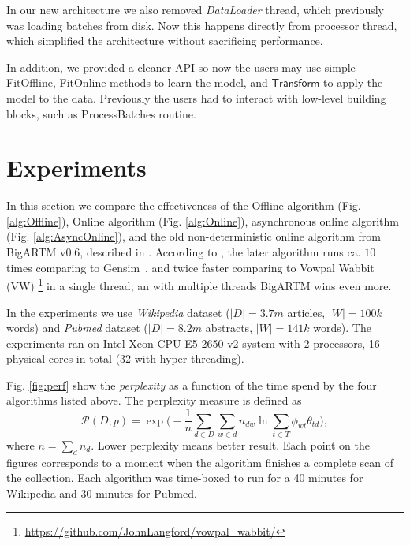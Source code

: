 \documentclass[russian,english]{llncs}
\newcommand{\kw}[1]{\textsf{#1}}
\begin{document}
In our new architecture we also removed \emph{DataLoader} thread, which previously was loading batches from disk.
Now this happens directly from processor thread, which simplified the architecture without sacrificing performance.

In addition, we provided a cleaner API so now the users may use simple \kw{FitOffline}, \kw{FitOnline} methods to learn the model,
and $\kw{Transform}$ to apply the model to the data.
Previously the users had to interact with low-level building blocks, such as \kw{ProcessBatches} routine.

\section{Experiments}
\label{sec:Experiments}

In this section we compare the effectiveness of the
\kw{Offline algorithm} (Fig. \ref{alg:Offline}),
\kw{Online algorithm} (Fig. \ref{alg:Online}),
asynchronous online algorithm (Fig. \ref{alg:AsyncOnline}),
and the old non-deterministic online algorithm from \kw{BigARTM v0.6}, described in \cite{vfardi15aist}.
According to \cite{vfardi15aist}, the later algorithm
runs ca. $10$ times comparing to Gensim~\cite{rehurek10software},
and twice faster comparing to 
Vowpal Wabbit (VW)%
\footnote{\url{https://github.com/JohnLangford/vowpal_wabbit/}}
in a single thread;
an with multiple threads BigARTM wins even more.

In the experiments we use \emph{Wikipedia} dataset ($|D| = 3.7m$ articles, $|W| = 100k$ words)
and \emph{Pubmed} dataset ($|D| = 8.2m$ abstracts, $|W| = 141k$ words).
The experiments ran on Intel Xeon CPU E5-2650 v2 system with 2 processors, 16 physical cores in total (32 with hyper-threading).


Fig. \ref{fig:perf} show the \emph{perplexity} as a function of the time spend by the four algorithms listed above.
The perplexity measure is defined as
\begin{equation}
\label{eq:perplexity}
\mathscr{P}(D, p) =
\exp \biggl( - \frac{1}{n} \sum_{d \in D} \sum_{w \in d} n_{dw} \ln \sum_{t\in T} \phi_{wt} \theta_{td} \biggr),
\end{equation}
 where $n = \sum_d n_d$. Lower perplexity means better result.
Each point on the figures corresponds to a moment when the algorithm finishes a complete scan of the collection.
Each algorithm was time-boxed to run for a 40 minutes for Wikipedia and 30 minutes for Pubmed.
\end{document}
